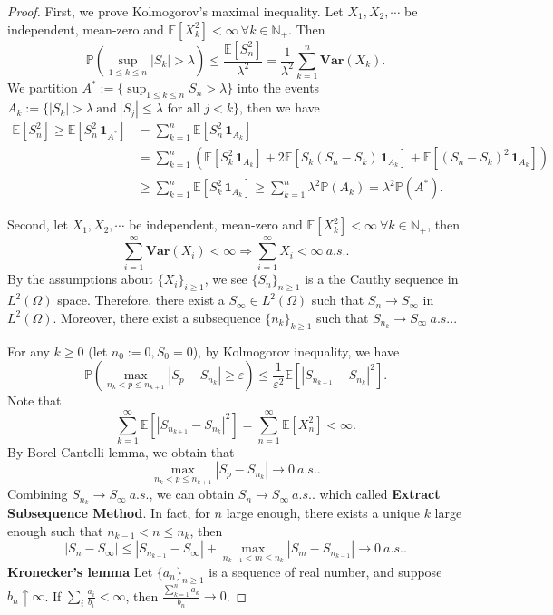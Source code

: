 \documentclass[11pt]{article}
\theoremstyle{definition}
\newcommand{\abs}[1]{\left\vert#1\right\vert}
\begin{document}
\begin{proof}
First, we prove Kolmogorov's maximal inequality. Let 
 $X_1, X_2,\cdots$ be independent, mean-zero and $\mathbb{E}[X_k^2]<\infty\ \forall k\in \mathbb{N}_+$. Then
\[
\mathbb{P}\left( \sup_{1\le k\le n} \abs{S_k}>\lambda \right)\le \frac{\mathbb{E}[S^2_n]}{\lambda^2}=\frac{1}{\lambda^2}\sum^n_{k=1} \mathbf{Var}(X_k).
\]
We partition $A^*:=\{ \sup_{1\le k\le n} S_n>\lambda \}$ into the events $A_k:=\{ \abs{S_k}>\lambda\  \text{and} \ \abs{S_j}\le \lambda \text{\ for all $j<k$} \}$, then we have
\begin{equation*}
  \begin{aligned}
    \mathbb{E}[S_n^2]\ge \mathbb{E}[S_n^2\,\mathbf{1}_{A^*}] & =\sum^n_{k=1}\mathbb{E}[S_n^2\,\mathbf{1}_{A_k}]\\ 
&=\sum^n_{k=1}\left( \mathbb{E}[S^2_k\,\mathbf{1}_{A_k}]+2\mathbb{E}[S_k(S_n-S_k)\,\mathbf{1}_{A_k}] +\mathbb{E}[(S_n-S_k)^2\,\mathbf{1}_{A_k}]\right)\\ 
&\ge \sum^n_{k=1}\mathbb{E}[S_k^2\,\mathbf{1}_{A_k}]\ge \sum^n_{k=1}\lambda^2\mathbb{P}(A_k)=\lambda^2 \mathbb{P}(A^*).
  \end{aligned}
\end{equation*}


Second, let $X_1, X_2,\cdots$ be independent, mean-zero and $\mathbb{E}[X_k^2] <\infty\ \forall k\in \mathbb{N}_+$, then 
\[
\sum^\infty_{i=1}\mathbf{Var}(X_i)<\infty \Rightarrow \sum^\infty_{i=1}X_i <\infty\ a.s..
\]
By the assumptions about $\{X_i\}_{i\ge 1}$, we see $\{S_n\}_{n\ge 1}$ is a the Cauthy sequence in $L^2(\Omega)$ space. Therefore, there exist a $S_\infty\in L^2(\Omega)$ such that $S_n\rightarrow S_\infty$ in $L^2(\Omega)$. Moreover, there exist a subsequence $\{n_k\}_{k\ge 1}$ such that $S_{n_k}\rightarrow S_\infty\ a.s..$.

For any $k\ge 0$ (let $n_0:=0, S_0=0$), by Kolmogorov inequality, we have
\[
\mathbb{P}\left( \max_{n_k<p\le n_{k+1}}\abs{S_p-S_{n_k}}\ge \varepsilon \right)\le \frac{1}{\varepsilon^2}\mathbb{E}[\abs{S_{n_{k+1}}-S_{n_k}}^2].
\]
Note that 
\[
\sum^\infty_{k=1}\mathbb{E}[\abs{S_{n_{k+1}}-S_{n_k}}^2]=\sum^\infty_{n=1}\mathbb{E}[X_n^2]<\infty.
\]
By Borel-Cantelli lemma, we obtain that
\[
\max_{n_k<p\le n_{k+1}}\abs{S_p-S_{n_k}}\rightarrow 0\ a.s..
\]
Combining $S_{n_k}\rightarrow S_\infty\ a.s.$, we can obtain $S_n\rightarrow S_\infty\ a.s..$ which called
{\bf Extract Subsequence Method}. In fact, for $n$ large enough, there exists a unique $k$ large enough such that $n_{k-1}<n\le n_k$, then
\[
\abs{S_n-S_\infty}\le \abs{S_{n_{k-1}}-S_\infty}+\max_{n_{k-1}<m\le n_k}\abs{S_m-S_{n_{k-1}}}\rightarrow 0\ a.s..
\]
{\bf Kronecker's lemma} Let $\{ a_n \}_{n\ge 1}$ is a sequence of real number, and suppose $b_n\uparrow \infty$. If $\sum_i 
\frac{a_i}{b_i}<\infty$, then $\frac{\sum^n_{k=1} a_k}{b_n}\rightarrow 0$.



\end{proof}
\end{document}
